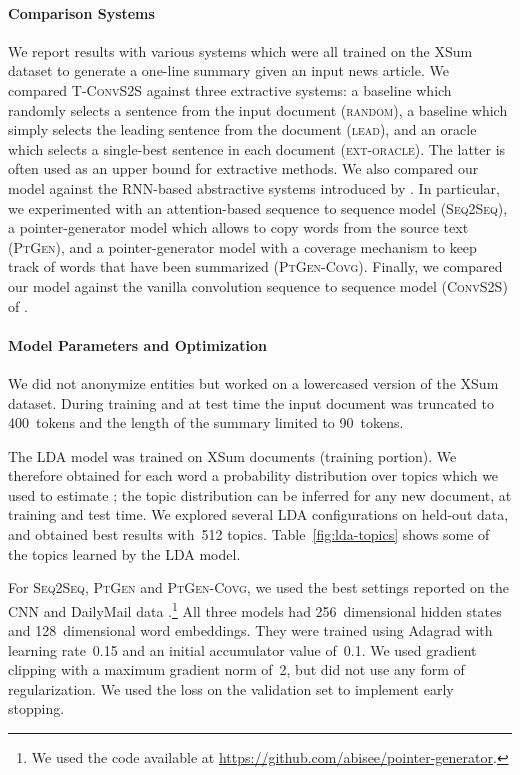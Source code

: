\documentclass[11pt,a4paper]{article}
\begin{document}
\paragraph{Comparison Systems} 
We report results with various systems which were all trained on the
XSum dataset to generate a one-line summary given an input news
article.  We compared \mbox{\textsc{T-ConvS2S}} against three
extractive systems: a baseline which randomly selects a sentence from
the input document (\textsc{random}), a baseline which simply selects
the leading sentence from the document (\textsc{lead}), and an oracle
which selects a single-best sentence in each document
(\textsc{ext-oracle}). The latter is often used as an upper bound for
extractive methods. We also compared our model against the RNN-based
abstractive systems introduced by . In particular,
we experimented with an attention-based sequence to sequence model
(\textsc{Seq2Seq}), a pointer-generator model which allows to copy
words from the source text (\textsc{PtGen}), and a pointer-generator
model with a coverage mechanism to keep track of words that have been
summarized (\textsc{PtGen-Covg}). Finally, we compared our model
against the vanilla convolution sequence to sequence model
(\textsc{ConvS2S}) of .



\paragraph{Model Parameters and Optimization} 

We did not anonymize entities but worked on a lowercased version of
the XSum dataset. During training and at test time the input document
was truncated to 400~tokens and  the length of the summary limited to
90~tokens.

The LDA model \cite{Blei:2003:LDA} was trained on XSum documents
(training portion). We therefore obtained for each word a probability
distribution over topics which we used to estimate ; the
topic distribution  can be inferred for any new document, at
training and test time. We explored several LDA configurations on
held-out data, and obtained best results with~512
topics. Table~\ref{fig:lda-topics} shows some of the topics learned by
the LDA model.



For \textsc{Seq2Seq}, \textsc{PtGen} and \textsc{PtGen-Covg}, we used
the best settings reported on the CNN and DailyMail data
\cite{see-acl17}.\footnote{We used the code available at
  \url{https://github.com/abisee/pointer-generator}.}  All three
models had 256~dimensional hidden states and 128~dimensional word
embeddings. They were trained using Adagrad \cite{Duchi:2011} with
learning rate~0.15 and an initial accumulator value of~0.1. We used
gradient clipping with a maximum gradient norm of~2, but did not use
any form of regularization.  We used the loss on the validation set to
implement early stopping. 
\end{document}
